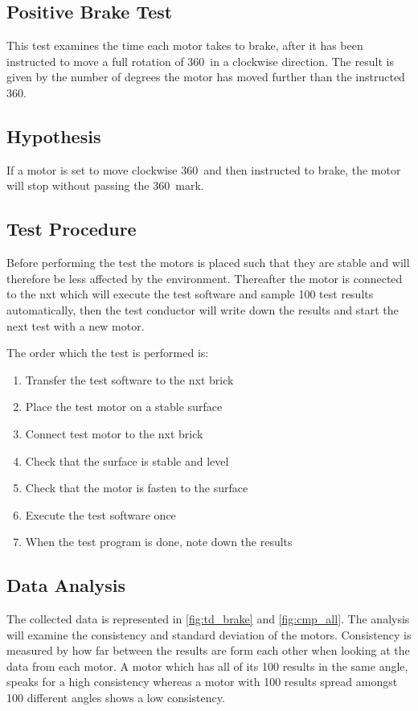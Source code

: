 \subsection{Positive Brake Test}\label{sec:braketest_pos}
This test examines the time each motor takes to brake, after it has been instructed to move a full rotation of 360\degree\ in a clockwise direction. The result is given by the number of degrees the motor has moved further than the instructed 360\degree.

\subsection{Hypothesis} 
If a motor is set to move clockwise 360\degree\ and then instructed to brake, the motor will stop without passing the 360\degree\ mark.

\subsection{Test Procedure}
Before performing the test the motors is placed such that they are stable and will therefore be less affected by the environment. Thereafter the motor is connected to the \gls{nxt} which will execute the test software and sample 100 test results automatically, then the test conductor will write down the results and start the next test with a new motor.

The order which the test is performed is:
\begin{enumerate}
  \item Transfer the test software to the \gls{nxt} brick
  \item Place the test motor on a stable surface
  \item Connect test motor to the \gls{nxt} brick
  \item Check that the surface is stable and level
  \item Check that the motor is fasten to the surface
  \item Execute the test software once
  \item When the test program is done, note down the results
\end{enumerate}

\subsection{Data Analysis}
The collected data is represented in \cref{fig:td_brake} and \cref{fig:cmp_all}. The analysis will examine the consistency and standard deviation of the motors. Consistency is measured by how far between the results are form each other when looking at the data from each motor. A motor which has all of its 100 results in the same angle, speaks for a high consistency whereas a motor with 100 results spread amongst 100 different angles shows a low consistency.

